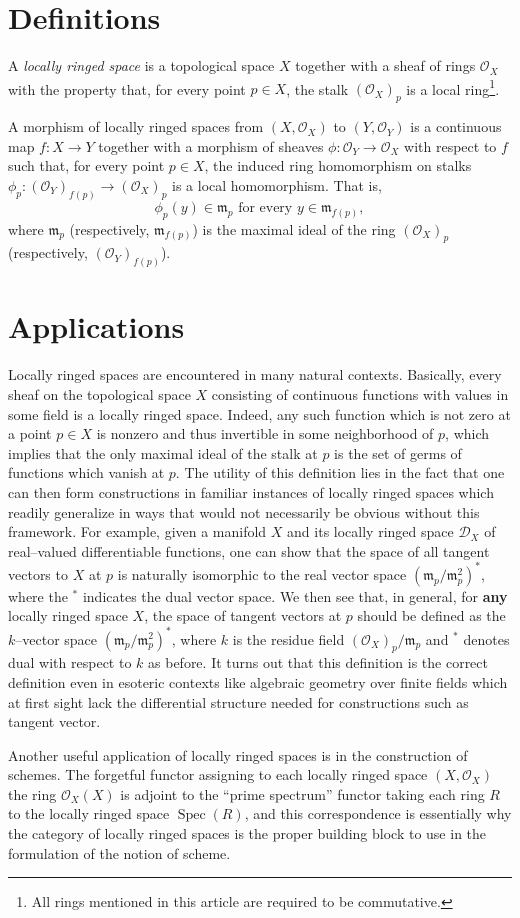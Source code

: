 \documentclass[12pt]{article}
\renewcommand{\O}{\mathcal{O}}
\newcommand{\m}{\mathfrak{m}}
\newcommand{\lra}{\longrightarrow}
\begin{document}
\section{Definitions}

A {\em locally ringed space} is a topological space $X$ together with a sheaf of rings $\O_X$ with the property that, for every point $p \in X$, the stalk $(\O_X)_p$ is a local ring\footnote{All rings mentioned in this article are required to be commutative.}.

A morphism of locally ringed spaces from $(X,\O_X)$ to $(Y,\O_Y)$ is a continuous map $f: X \lra Y$ together with a morphism of sheaves $\phi: \O_Y \lra \O_X$ with respect to $f$ such that, for every point $p \in X$, the induced ring homomorphism on stalks $\phi_p: (\O_Y)_{f(p)} \lra (\O_X)_p$ is a local homomorphism. That is,
$$
\phi_p(y) \in \m_p \text{ for every } y \in \m_{f(p)},
$$
where $\m_p$ (respectively, $\m_{f(p)}$) is the maximal ideal of the ring $(\O_X)_p$ (respectively, $(\O_Y)_{f(p)}$).

\section{Applications}

Locally ringed spaces are encountered in many natural contexts. Basically, every sheaf on the topological space $X$ consisting of continuous functions with values in some field is a locally ringed space. Indeed, any such function which is not zero at a point $p \in X$ is nonzero and thus invertible in some neighborhood of $p$, which implies that the only maximal ideal of the stalk at $p$ is the set of germs of functions which vanish at $p$. The utility of this definition lies in the fact that one can then form constructions in familiar instances of locally ringed spaces which readily generalize in ways that would not necessarily be obvious without this framework. For example, given a manifold $X$ and its locally ringed space $\mathcal{D}_X$ of real--valued differentiable functions, one can show that the space of all tangent vectors to $X$ at $p$ is naturally isomorphic to the real vector space $(\m_p/\m_p^2)^*$, where the $^*$ indicates the dual vector space. We then see that, in general, for {\bf any} locally ringed space $X$, the space of tangent vectors at $p$ should be defined as the $k$--vector space $(\m_p/\m_p^2)^*$, where $k$ is the residue field $(\O_X)_p / \m_p$ and $^*$ denotes dual with respect to $k$ as before. It turns out that this definition is the correct definition even in esoteric contexts like algebraic geometry over finite fields which at first sight lack the differential structure needed for constructions such as tangent vector.

Another useful application of locally ringed spaces is in the construction of schemes. The forgetful functor assigning to each locally ringed space $(X,\O_X)$ the ring $\O_X(X)$ is adjoint to the ``prime spectrum'' functor taking each ring $R$ to the locally ringed space $\operatorname{Spec}(R)$, and this correspondence is essentially why the category of locally ringed spaces is the proper building block to use in the formulation of the notion of scheme.
\end{document}
